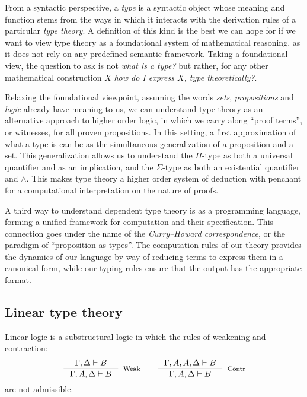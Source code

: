 From a syntactic perspective, a \textit{type} is a syntactic object whose meaning and function stems from the ways in which it interacts with the derivation rules of a particular \textit{type theory}. A definition of this kind is the best we can hope for if we want to view type theory as a foundational system of mathematical reasoning, as it does not rely on any predefined semantic framework. Taking a foundational view, the question to ask is not \textit{what is a type?} but rather, for any other mathematical construction $X$ \textit{how do I express $X$, type theoretically?}.

Relaxing the foundational viewpoint, assuming the words \textit{sets}, \textit{propositions} and \textit{logic} already have meaning to us, we can understand type theory as an alternative approach to higher order logic, in which we carry along ``proof terms'', or witnesses, for all proven propositions. In this setting, a first approximation of what a type is can be as the simultaneous generalization of a proposition and a set. This generalization allows us to understand the $\Pi$-type as both a universal quantifier and as an implication, and the $\Sigma$-type as both an existential quantifier and $\land$. This makes type theory a higher order system of deduction with penchant for a computational interpretation on the nature of proofs.

A third way to understand dependent type theory is as a programming language, forming a unified framework for computation and their specification. This connection goes under the name of the \textit{Curry--Howard correspondence}, or the paradigm of ``proposition as types''. The computation rules of our theory provides the dynamics of our language by way of reducing terms to express them in a canonical form, while our typing rules ensure that the output has the appropriate format.
\subsection{Linear type theory}
Linear logic is a substructural logic in which the rules of weakening and contraction:
\[
  \begin{split}
    \inference{\Gamma, \Delta \vdash B}{\Gamma, A, \Delta \vdash B}[Weak] \quad \quad 
    \inference{\Gamma, A, A, \Delta \vdash B}{\Gamma, A, \Delta \vdash B}[Contr]
    \end{split}
\]
are not admissible.


